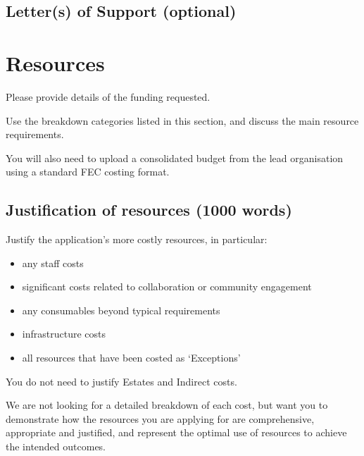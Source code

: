 \documentclass[12pt]{article}
\newenvironment{instruction}{%
    \begin{tcolorbox}[colback=red!5,colframe=red,title=Instruction]%
}{%
    \end{tcolorbox}%
}
\begin{document}
\subsection{Letter(s) of Support (optional)}

\pagebreak

\section{Resources}

\begin{instruction}

Please provide details of the funding requested.

Use the breakdown categories listed in this section, and discuss the main resource requirements.

You will also need to upload a consolidated budget from the lead organisation using a standard FEC costing format.

\end{instruction}

\subsection{Justification of resources (1000 words)}

\begin{instruction}

Justify the application’s more costly resources, in particular:

\begin{itemize}
    \item any staff costs
    \item significant costs related to collaboration or community engagement
    \item any consumables beyond typical requirements
    \item infrastructure costs
    \item all resources that have been costed as ‘Exceptions’
\end{itemize}

You do not need to justify Estates and Indirect costs.

We are not looking for a detailed breakdown of each cost, but want you to demonstrate how the resources you are applying for are comprehensive, appropriate and justified, and represent the optimal use of resources to achieve the intended outcomes.

\end{instruction}





\end{document}
